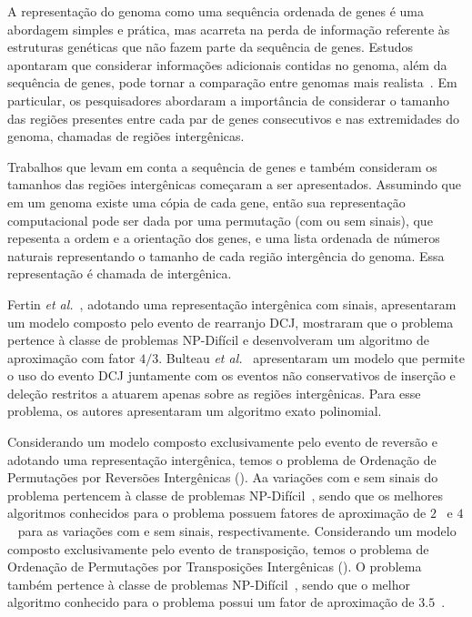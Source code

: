 A representação do genoma como uma sequência ordenada de genes é uma abordagem simples e prática, mas acarreta na perda de informação referente às estruturas genéticas que não fazem parte da sequência de genes. Estudos apontaram que considerar informações adicionais contidas no genoma, além da sequência de genes, pode tornar a comparação entre genomas mais realista~\cite{2016a-biller-etal, 2016b-biller-etal}. Em particular, os pesquisadores abordaram a importância de considerar o tamanho das regiões presentes entre cada par de genes consecutivos e nas extremidades do genoma, chamadas de regiões intergênicas. 

Trabalhos que levam em conta a sequência de genes e também consideram os tamanhos das regiões intergênicas começaram a ser apresentados. Assumindo que em um genoma existe uma cópia de cada gene, então sua representação computacional pode ser dada por uma permutação (com ou sem sinais), que repesenta a ordem e a orientação dos genes, e uma lista ordenada de números naturais representando o tamanho de cada região intergência do genoma. Essa representação é chamada de intergênica.

Fertin \textit{et al.}~\cite{2017-fertin-etal}, adotando uma representação intergênica com sinais, apresentaram um modelo composto pelo evento de rearranjo DCJ, mostraram que o problema pertence à classe de problemas NP-Difícil e desenvolveram um algoritmo de aproximação com fator $4/3$. Bulteau \textit{et al.}~\cite{2016b-bulteau-etal} apresentaram um modelo que permite o uso do evento DCJ juntamente com os eventos não conservativos de inserção e deleção restritos a atuarem apenas sobre as regiões intergênicas. Para esse problema, os autores apresentaram um algoritmo exato polinomial. 

Considerando um modelo composto exclusivamente pelo evento de reversão e adotando uma representação intergênica, temos o problema de Ordenação de Permutações por Reversões Intergênicas (\SbIR). Aa variações com e sem sinais do problema pertencem à classe de problemas NP-Difícil~\cite{2021b-oliveira-etal,2020a-brito-etal}, sendo que os melhores algoritmos conhecidos para o problema possuem fatores de aproximação de $2$~\cite{2021b-oliveira-etal} e $4$~\cite{2020a-brito-etal} para as variações com e sem sinais, respectivamente. Considerando um modelo composto exclusivamente pelo evento de transposição, temos o problema de Ordenação de Permutações por Transposições Intergênicas (\SbIT). O problema também pertence à classe de problemas NP-Difícil~\cite{2021a-oliveira-etal}, sendo que o melhor algoritmo conhecido para o problema possui um fator de aproximação de $3.5$~\cite{2021a-oliveira-etal}.

